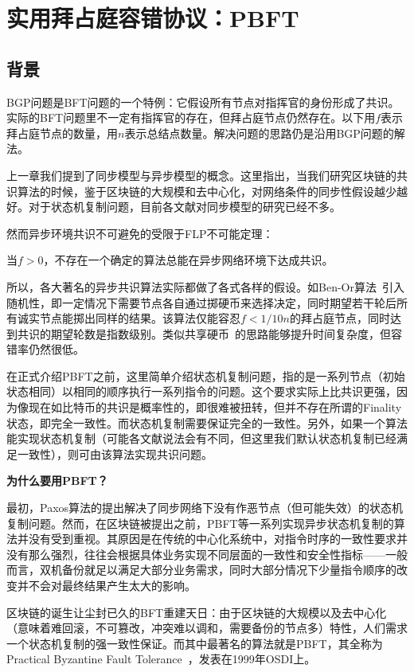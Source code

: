\section{实用拜占庭容错协议：PBFT}
\subsection{背景}
BGP问题是BFT问题的一个特例：它假设所有节点对指挥官的身份形成了共识。实际的BFT问题里不一定有指挥官的存在，但拜占庭节点仍然存在。以下用$f$表示拜占庭节点的数量，用$n$表示总结点数量。解决问题的思路仍是沿用BGP问题的解法。

上一章我们提到了同步模型与异步模型的概念。这里指出，当我们研究区块链的共识算法的时候，鉴于区块链的大规模和去中心化，对网络条件的同步性假设越少越好。对于状态机复制问题，目前各文献对同步模型的研究已经不多。

然而异步环境共识不可避免的受限于FLP不可能定理：
\begin{theorem}
	当$f>0$，不存在一个确定的算法总能在异步网络环境下达成共识。
\end{theorem}
所以，各大著名的异步共识算法实际都做了各式各样的假设。如Ben-Or算法~\cite{ben1983another}引入随机性，即一定情况下需要节点各自通过掷硬币来选择决定，同时期望若干轮后所有诚实节点能掷出同样的结果。该算法仅能容忍$f<1/10n$的拜占庭节点，同时达到共识的期望轮数是指数级别。类似共享硬币~\cite{bracha1987asynchronous}的思路能够提升时间复杂度，但容错率仍然很低。

在正式介绍PBFT之前，这里简单介绍状态机复制问题，指的是一系列节点（初始状态相同）以相同的顺序执行一系列指令的问题。这个要求实际上比共识更强，因为像现在如比特币的共识是概率性的，即很难被扭转，但并不存在所谓的Finality状态，即完全一致性。而状态机复制需要保证完全的一致性。另外，如果一个算法能实现状态机复制（可能各文献说法会有不同，但这里我们默认状态机复制已经满足一致性），则可由该算法实现共识问题。

\textbf{为什么要用PBFT？}

最初，Paxos\cite{lamport2001paxos}算法的提出解决了同步网络下没有作恶节点（但可能失效）的状态机复制问题。然而，在区块链被提出之前，PBFT等一系列实现异步状态机复制的算法并没有受到重视。其原因是在传统的中心化系统中，对指令时序的一致性要求并没有那么强烈，往往会根据具体业务实现不同层面的一致性和安全性指标——一般而言，双机备份就足以满足大部分业务需求，同时大部分情况下少量指令顺序的改变并不会对最终结果产生太大的影响。

区块链的诞生让尘封已久的BFT重建天日：由于区块链的大规模以及去中心化（意味着难回滚，不可篡改，冲突难以调和，需要备份的节点多）特性，人们需求一个状态机复制的强一致性保证。而其中最著名的算法就是PBFT，其全称为Practical Byzantine Fault Tolerance~\cite{castro1999practical}，发表在1999年OSDI上。

